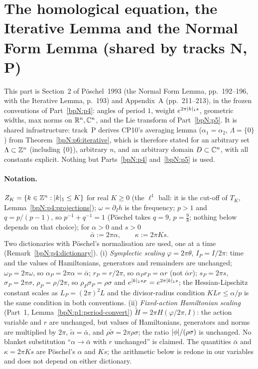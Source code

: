 \section{The homological equation, the Iterative Lemma and the Normal Form Lemma (shared by tracks N, P)}\label{bpN:p6}
\providecommand{\wn}[3]{\lvert #1\rvert_{#2,#3}}
\providecommand{\Dom}[2]{\mathcal D_{#1,#2}}
\providecommand{\Os}[2]{\mathcal O(#1,#2)}
\providecommand{\ba}{\bar\alpha}
\begingroup\sloppy

This part is Section~2 of P\"oschel~1993 (the Normal Form Lemma, pp.~192--196, with the Iterative Lemma, p.~193) and Appendix~A (pp.~211--213), in the frozen conventions of Part~\ref{bpN:p4}: angles of period $1$, weight $e^{2\pi\lvert k\rvert_1s}$, geometric widths, max norms on $\mathbb{R}^n,\mathbb{C}^n$, and the Lie transform of Part~\ref{bpN:p5}.
It is shared infrastructure: track~P derives CP10's averaging lemma ($\alpha_1=\alpha_2$, $\Lambda=\{0\}$) from Theorem~\ref{bpN:p6:iterative}, which is therefore stated for an arbitrary set $\Lambda\subset\mathbb{Z}^n$ (including $\{0\}$), arbitrary $n$, and an arbitrary domain $D\subset\mathbb{C}^n$, with all constants explicit. Nothing but Parts~\ref{bpN:p4} and~\ref{bpN:p5} is used.

\paragraph{Notation.} $Z_K=\{k\in\mathbb{Z}^n:\lvert k\rvert_1\le K\}$ for real $K\ge0$ (the $\ell^1$ ball: it is the cut-off of $T_K$, Lemma~\ref{bpN:p4:projections}); $\omega=\partial_Ih$ is the frequency; $p>1$ and $q=p/(p-1)$, so $p^{-1}+q^{-1}=1$ (P\"oschel takes $q=9$, $p=\tfrac98$; nothing below depends on that choice); for $\alpha>0$ and $s>0$
\[\ba:=2\pi\alpha,\qquad \kappa:=2\pi Ks .\]
Two dictionaries with P\"oschel's normalisation are used, one at a time (Remark~\ref{bpN:p4:dictionary}).
(i) \emph{Symplectic scaling} $\varphi=2\pi\theta$, $I_P=I/2\pi$: time and the values of Hamiltonians, generators and remainders are unchanged; $\omega_P=2\pi\omega$, so $\alpha_P=2\pi\alpha=\ba$; $r_P=r/2\pi$, so $\alpha_Pr_P=\alpha r$ (not $\ba r$); $s_P=2\pi s$, $\sigma_P=2\pi\sigma$, $\rho_P=\rho/2\pi$, so $\rho_P\sigma_P=\rho\sigma$ and $e^{\lvert k\rvert_1s_P}=e^{2\pi\lvert k\rvert_1s}$; the Hessian-Lipschitz constant scales as $L_P=(2\pi)^2L$ and the divisor-radius condition $KLr\le\alpha/p$ is the same condition in both conventions.
(ii) \emph{Fixed-action Hamiltonian scaling} (Part~1, Lemma~\ref{bpN:p1:period-convert}) $\tilde H=2\pi H(\varphi/2\pi,I)$: the action variable and $r$ are unchanged, but values of Hamiltonians, generators and norms are multiplied by $2\pi$, $\tilde\alpha=\ba$, and $\rho\tilde\sigma=2\pi\rho\sigma$; the ratio $\lvert \phi\rvert/(\rho\sigma)$ is unchanged.
No blanket substitution ``$\alpha\to\ba$ with $r$ unchanged'' is claimed. The quantities $\ba$ and $\kappa=2\pi Ks$ are P\"oschel's $\alpha$ and $Ks$; the arithmetic below is redone in our variables and does not depend on either dictionary.

